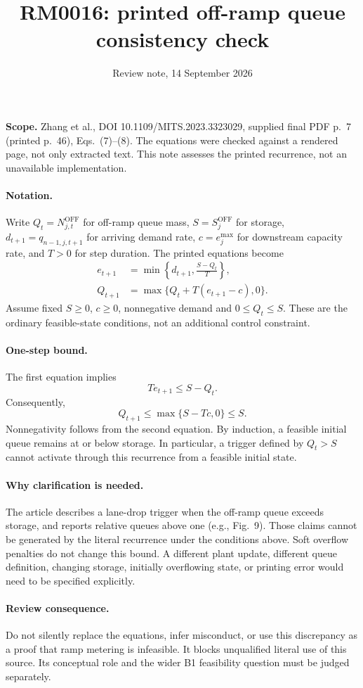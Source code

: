 \documentclass[11pt]{article}
\title{RM0016: printed off-ramp queue consistency check}
\author{Review note, 14 September 2026}
\date{}
\begin{document}
\maketitle
\noindent\textbf{Scope.} Zhang et al., DOI 10.1109/MITS.2023.3323029, supplied final PDF p.~7 (printed p.~46), Eqs.~(7)--(8). The equations were checked against a rendered page, not only extracted text. This note assesses the printed recurrence, not an unavailable implementation.

\paragraph{Notation.} Write $Q_t=N^{\mathrm{OFF}}_{j,t}$ for off-ramp queue mass, $S=S^{\mathrm{OFF}}_j$ for storage, $d_{t+1}=q_{n-1,j,t+1}$ for arriving demand rate, $c=e_j^{\max}$ for downstream capacity rate, and $T>0$ for step duration. The printed equations become
\begin{align}
e_{t+1}&=\min\left\{d_{t+1},\frac{S-Q_t}{T}\right\},\\
Q_{t+1}&=\max\{Q_t+T(e_{t+1}-c),0\}.
\end{align}
Assume fixed $S\geq0$, $c\geq0$, nonnegative demand and $0\leq Q_t\leq S$. These are the ordinary feasible-state conditions, not an additional control constraint.

\paragraph{One-step bound.} The first equation implies
\[
T e_{t+1}\leq S-Q_t.
\]
Consequently,
\[
Q_{t+1}\leq\max\{S-Tc,0\}\leq S.
\]
Nonnegativity follows from the second equation. By induction, a feasible initial queue remains at or below storage. In particular, a trigger defined by $Q_t>S$ cannot activate through this recurrence from a feasible initial state.

\paragraph{Why clarification is needed.} The article describes a lane-drop trigger when the off-ramp queue exceeds storage, and reports relative queues above one (e.g., Fig.~9). Those claims cannot be generated by the literal recurrence under the conditions above. Soft overflow penalties do not change this bound. A different plant update, different queue definition, changing storage, initially overflowing state, or printing error would need to be specified explicitly.

\paragraph{Review consequence.} Do not silently replace the equations, infer misconduct, or use this discrepancy as a proof that ramp metering is infeasible. It blocks unqualified literal use of this source. Its conceptual role and the wider B1 feasibility question must be judged separately.
\end{document}
